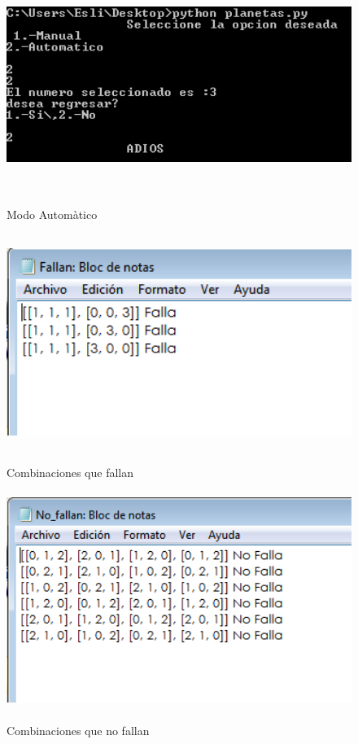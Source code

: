 \documentclass[12pt]{article}
\begin{document}
\begin{figure}[H]
\includegraphics[width=\textwidth, height=7cm]{auto_planetas}
\label{fig:manual_afn}
\caption{Modo Automàtico}
\end{figure}

\begin{figure}[H]
\includegraphics[width=\textwidth, height=7cm]{auto_planetas_salida}
\label{fig:manual_afn}
\caption{Combinaciones que fallan}
\end{figure}
\begin{figure}[H]
\includegraphics[width=\textwidth, height=7cm]{auto_planetas_salida2}
\label{fig:manual_afn}
\caption{Combinaciones que no fallan}
\end{figure}
\end{document}
